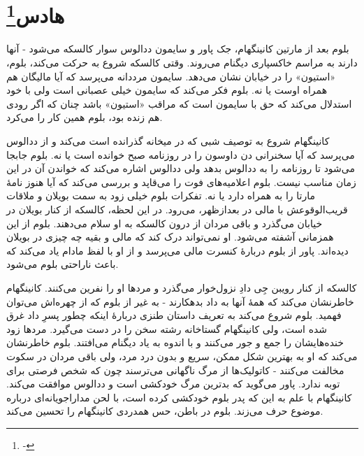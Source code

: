 \documentclass[12pt]{book}
\newcommand{\noun}[1]{«{#1}»}
\begin{document}
    \chapter[هادس]{هادس\protect\footnote{-}}\label{ep:6}
    بلوم بعد از مارتین کانینگهام، جک پاور و سایمون ددالوس سوار کالسکه می‌شود - آنها دارند به مراسم خاکسپاری دیگنام می‌روند. وقتی کالسکه شروع به حرکت می‌کند، بلوم، \noun{استیون} را در خیابان نشان می‌دهد. سایمون مرددانه می‌پرسد که آیا مالیگان هم همراه اوست یا نه. بلوم فکر می‌کند که سایمون خیلی عصبانی است ولی با خود استدلال می‌کند که حق با سایمون است که مراقب \noun{استیون} باشد چنان که اگر رودی هم زنده بود، بلوم همین کار را می‌کرد.

    کانینگهام شروع به توصیف شبی که در میخانه گذرانده است می‌کند و از ددالوس می‌پرسد که آیا سخنرانی دن داوسون را در روزنامه صبح خوانده است یا نه. بلوم جابجا می‌شود تا روزنامه را به ددالوس بدهد ولی ددالوس اشاره می‌کند که خواندن آن در این زمان مناسب نیست. بلوم اعلامیه‌های فوت را می‌قاپد و بررسی می‌کند که آیا هنوز نامۀ مارتا را به همراه دارد یا نه. تفکرات بلوم خیلی زود به سمت بویلان و ملاقات قریب‌الوقوعش با مالی در بعدازظهر، می‌رود. در این لحظه، کالسکه از کنار بویلان در خیابان می‌گذرد و باقی مردان از درون کالسکه به او سلام می‌دهند. بلوم از این همزمانی آشفته می‌شود. او نمی‌تواند درک کند که مالی و بقیه چه چیزی در بویلان دیده‌اند. پاور از بلوم دربارۀ کنسرت مالی می‌پرسد و از او با لفظ مادام یاد می‌کند که باعث ناراحتی بلوم می‌شود.

    کالسکه از کنار رویبن جِی دادِ نزول‌خوار می‌گذرد و مردها او را نفرین می‌کنند. کانینگهام خاطرنشان می‌کند که همۀ آنها به داد بدهکارند - به غیر از بلوم که از چهره‌اش می‌توان فهمید. بلوم شروع می‌کند به تعریف داستان طنزی دربارۀ اینکه چطور پسرِ داد غرق شده است، ولی کانینگهام گستاخانه رشته سخن را در دست می‌گیرد. مردها زود خنده‌هایشان را جمع و جور می‌کنند و با اندوه به یاد دیگنام می‌افتند. بلوم خاطرنشان می‌کند که او به بهترین شکل ممکن، سریع و بدون درد مرد، ولی باقی مردان در سکوت مخالفت می‌کنند - کاتولیک‌ها از مرگ ناگهانی می‌ترسند چون که شخص فرصتی برای توبه ندارد. پاور می‌گوید که بدترین مرگ خودکشی است و ددالوس موافقت می‌کند. کانینگهام با علم به این که پدر بلوم خودکشی کرده است، با لحن مداراجویانه‌ای درباره موضوع حرف می‌زند. بلوم در باطن، حس همدردی کانینگهام را تحسین می‌کند.
\end{document}
